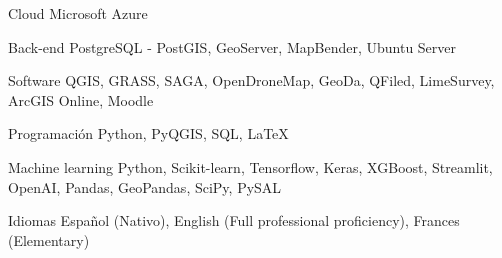 

\begin{cvskills}

  \cvskill
    {Cloud} %
    {Microsoft Azure} %

  \cvskill
    {Back-end} %
    {PostgreSQL - PostGIS, GeoServer, MapBender, Ubuntu Server} %

  \cvskill
    {Software} %
    {QGIS, GRASS, SAGA, OpenDroneMap, GeoDa, QFiled, LimeSurvey,
    ArcGIS Online, Moodle} %

  \cvskill
    {Programación} %
    {Python, PyQGIS, SQL, \LaTeX} %

  \cvskill
    {Machine learning} %
    {Python, Scikit-learn, Tensorflow, Keras, XGBoost, Streamlit, OpenAI, Pandas,
    GeoPandas, SciPy, PySAL} %

  \cvskill
    {Idiomas} %
    {Español (Nativo),
    English (Full professional proficiency),
    Frances (Elementary)} %

\end{cvskills}
